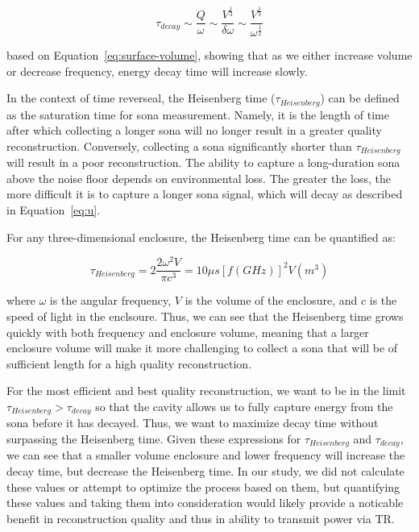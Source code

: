 \begin{equation}
\tau_{decay} \sim \frac{Q}{\omega} \sim \frac{V^{\frac{1}{3}}}{\delta\omega} \sim \frac{V^{\frac{1}{3}}}{\omega^{\frac{1}{2}}}
\label{eq:decay-time}
\end{equation}

based on Equation~\ref{eq:surface-volume}, showing that as we either increase volume or decrease frequency, energy decay time will increase slowly.


In the context of time reverseal, the Heisenberg time ($\tau_{Heisenberg}$) can be defined as the saturation time for sona measurement. Namely, it is the length of time after which collecting a longer sona will no longer result in a greater quality reconstruction. Conversely, collecting a sona significantly shorter than $\tau_{Heisenberg}$ will result in a poor reconstruction. The ability to capture a long-duration sona above the noise floor depends on environmental loss. The greater the loss, the more difficult it is to capture a longer sona signal, which will decay as described in Equation~\ref{eq:u}.

For any three-dimensional enclosure, the Heisenberg time can be quantified as:

\begin{equation}
\tau_{Heisenberg} = 2 \frac{2 \omega^2 V}{\pi c^3} = 10 \mu s {\left[f(GHz)\right]}^2 V(m^3)
\label{eq:heisenberg}
\end{equation}

where $\omega$ is the angular frequency, $V$ is the volume of the enclosure, and $c$ is the speed of light in the enclsoure. Thus, we can see that the Heisenberg time grows quickly with both frequency and enclosure volume, meaning that a larger enclosure volume will make it more challenging to collect a sona that will be of sufficient length for a high quality reconstruction.


For the most efficient and best quality reconstruction, we want to be in the limit $\tau_{Heisenberg} > \tau_{decay}$ so that the cavity allows us to fully capture energy from the sona before it has decayed. Thus, we want to maximize decay time without surpassing the Heisenberg time. Given these expressions for $\tau_{Heisenberg}$ and $\tau_{decay}$, we can see that a smaller volume enclosure and lower frequency will increase the decay time, but decrease the Heisenberg time. In our study, we did not calculate these values or attempt to optimize the process based on them, but quantifying these values and taking them into consideration would likely provide a noticable benefit in reconstruction quality and thus in ability to transmit power via TR.


